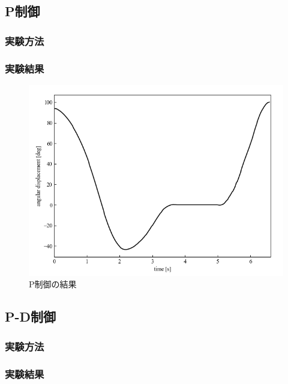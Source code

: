 \newpage

\subsection{P制御}
\subsubsection{実験方法}
\subsubsection{実験結果}

\begin{figure}[H]
	\centering
		\includegraphics[scale=0.5]{./figure/P.png}
		\caption{P制御の結果}
		\label{fig:P}
\end{figure}

\newpage

\subsection{P-D制御}
\subsubsection{実験方法}
\subsubsection{実験結果}

